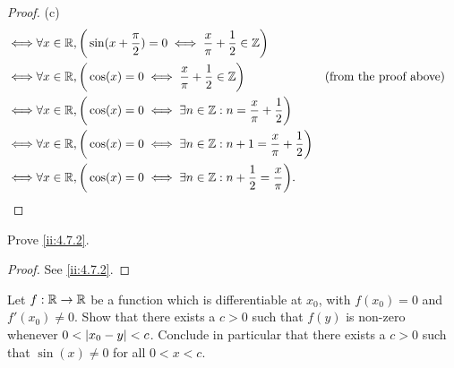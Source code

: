 \begin{proof}{(c)}
\begin{align*}
    \iff & \forall x \in \mathbb{R}, \bigg(\sin(x + \dfrac{\pi}{2}) = 0 \iff \dfrac{x}{\pi} + \dfrac{1}{2} \in \mathbb{Z}\bigg)                                       \\
    \iff & \forall x \in \mathbb{R}, \bigg(\cos(x) = 0 \iff \dfrac{x}{\pi} + \dfrac{1}{2} \in \mathbb{Z}\bigg)                     &  & \text{(from the proof above)} \\
    \iff & \forall x \in \mathbb{R}, \bigg(\cos(x) = 0 \iff \exists n \in \mathbb{Z} : n = \dfrac{x}{\pi} + \dfrac{1}{2}\bigg)                                        \\
    \iff & \forall x \in \mathbb{R}, \bigg(\cos(x) = 0 \iff \exists n \in \mathbb{Z} : n + 1 = \dfrac{x}{\pi} + \dfrac{1}{2}\bigg)                                    \\
    \iff & \forall x \in \mathbb{R}, \bigg(\cos(x) = 0 \iff \exists n \in \mathbb{Z} : n + \dfrac{1}{2} = \dfrac{x}{\pi}\bigg).
  \end{align*}
\end{proof}

\exercisesection

\begin{ex}\label{ii:ex:4.7.1}
  Prove \cref{ii:4.7.2}.
\end{ex}

\begin{proof}
  See \cref{ii:4.7.2}.
\end{proof}

\begin{ex}\label{ii:ex:4.7.2}
  Let \(f : \mathbb{R} \to \mathbb{R}\) be a function which is differentiable at \(x_0\), with \(f(x_0) = 0\) and \(f'(x_0) \neq 0\).
  Show that there exists a \(c > 0\) such that \(f(y)\) is non-zero whenever \(0 < \left\lvert x_0 - y\right\rvert < c\).
  Conclude in particular that there exists a \(c > 0\) such that \(\sin(x) \neq 0\) for all \(0 < x < c\).
\end{ex}

